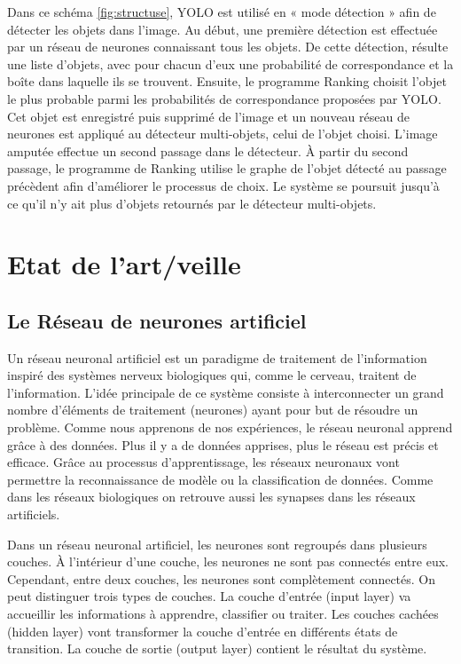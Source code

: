 \documentclass[debug,nodate,hideweeklyreports,noposter]{polytech/polytech}
\begin{document}
Dans ce schéma \autoref{fig:structuse}, YOLO est utilisé en « mode détection » afin de détecter les objets dans l’image. Au début, une première détection est effectuée par un réseau de neurones connaissant tous les objets. De cette détection, résulte une liste d’objets, avec pour chacun d’eux une probabilité de correspondance et la boîte dans laquelle ils se trouvent. Ensuite, le programme Ranking choisit l’objet le plus probable parmi les probabilités de correspondance proposées par YOLO. Cet objet est enregistré puis supprimé de l’image et un nouveau réseau de neurones est appliqué au détecteur multi-objets, celui de l’objet choisi. L’image amputée effectue un second passage dans le détecteur. À partir du second passage, le programme de Ranking utilise le graphe de l’objet détecté au passage précèdent afin d’améliorer le processus de choix. Le système se poursuit jusqu’à ce qu’il n’y ait plus d’objets retournés par le détecteur multi-objets.

\chapter{Etat de l'art/veille}
\section{Le Réseau de neurones artificiel}

Un réseau neuronal artificiel est un paradigme de traitement de l’information inspiré des systèmes nerveux biologiques qui, comme le cerveau, traitent de l’information. L'idée principale de ce système consiste à interconnecter un grand nombre d’éléments de traitement (neurones) ayant pour but de résoudre un problème. Comme nous apprenons de nos expériences, le réseau neuronal apprend grâce à des données. Plus il y a de données apprises, plus le réseau est précis et efficace. Grâce au processus d’apprentissage, les réseaux neuronaux vont permettre la reconnaissance de modèle ou la classification de données. Comme dans les réseaux biologiques on retrouve aussi les synapses dans les réseaux artificiels.

Dans un réseau neuronal artificiel, les neurones sont regroupés dans plusieurs couches. À l’intérieur d’une couche, les neurones ne sont pas connectés entre eux. Cependant, entre deux couches, les neurones sont complètement connectés. On peut distinguer trois types de couches. La couche d’entrée (input layer) va accueillir les informations à apprendre, classifier ou traiter. Les couches cachées (hidden layer) vont transformer la couche d’entrée en différents états de transition. La couche de sortie (output layer) contient le résultat du système.
\end{document}

